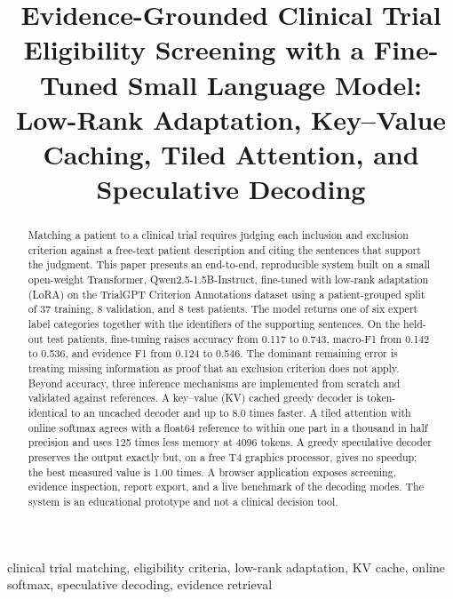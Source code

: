 \documentclass[conference]{IEEEtran}
\begin{document}
\title{Evidence-Grounded Clinical Trial Eligibility Screening with a Fine-Tuned Small Language Model: Low-Rank Adaptation, Key--Value Caching, Tiled Attention, and Speculative Decoding}

\author{
}

\maketitle

\begin{abstract}
Matching a patient to a clinical trial requires judging each inclusion and exclusion criterion against a free-text patient description and citing the sentences that support the judgment. This paper presents an end-to-end, reproducible system built on a small open-weight Transformer, Qwen2.5-1.5B-Instruct, fine-tuned with low-rank adaptation (LoRA) on the TrialGPT Criterion Annotations dataset using a patient-grouped split of 37 training, 8 validation, and 8 test patients. The model returns one of six expert label categories together with the identifiers of the supporting sentences. On the held-out test patients, fine-tuning raises accuracy from 0.117 to 0.743, macro-F1 from 0.142 to 0.536, and evidence F1 from 0.124 to 0.546. The dominant remaining error is treating missing information as proof that an exclusion criterion does not apply. Beyond accuracy, three inference mechanisms are implemented from scratch and validated against references. A key--value (KV) cached greedy decoder is token-identical to an uncached decoder and up to 8.0 times faster. A tiled attention with online softmax agrees with a float64 reference to within one part in a thousand in half precision and uses 125 times less memory at 4096 tokens. A greedy speculative decoder preserves the output exactly but, on a free T4 graphics processor, gives no speedup; the best measured value is 1.00 times. A browser application exposes screening, evidence inspection, report export, and a live benchmark of the decoding modes. The system is an educational prototype and not a clinical decision tool.
\end{abstract}

\begin{IEEEkeywords}
clinical trial matching, eligibility criteria, low-rank adaptation, KV cache, online softmax, speculative decoding, evidence retrieval
\end{IEEEkeywords}
\end{document}
